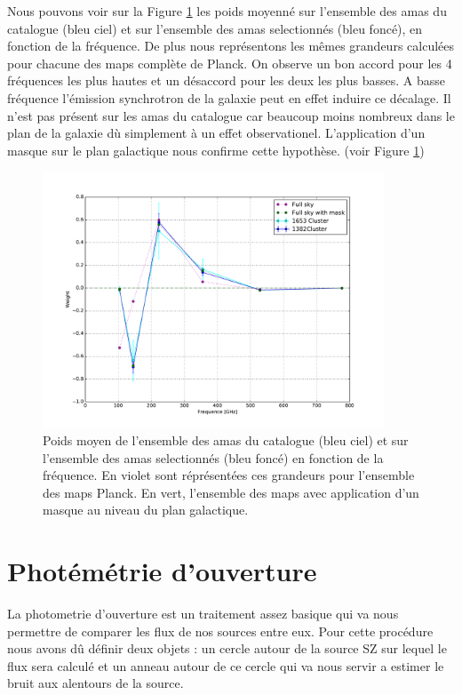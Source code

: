\documentclass[a4paper,11pt]{article}
\begin{document}
Nous pouvons voir sur la Figure \ref{w_full} les poids moyenné sur
l'ensemble des amas du catalogue (bleu ciel) et sur l'ensemble des
amas selectionnés (bleu foncé), en fonction de la fréquence. De plus
nous représentons les mêmes grandeurs calculées pour chacune des maps
complète de Planck. On observe un bon accord pour les 4 fréquences les
plus hautes et un désaccord pour les deux les plus basses. A basse
fréquence l'émission synchrotron de la galaxie peut en effet induire
ce décalage. Il n'est pas présent sur les amas du catalogue car
beaucoup moins nombreux dans le plan de la galaxie dù simplement à un
effet observationel. L'application d'un masque sur le plan galactique
nous confirme cette hypothèse. (voir Figure \ref{w_full})

\begin{figure}[h!]
  \centering
  \label{w_full}
  \includegraphics[width=4in]{w_full.pdf}
  \caption{Poids moyen de l'ensemble des amas du catalogue (bleu ciel) et sur
    l'ensemble des amas selectionnés (bleu foncé) en fonction
    de la fréquence. En violet sont réprésentées ces grandeurs pour
    l'ensemble des maps Planck. En vert, l'ensemble des maps avec
    application d'un masque au niveau du plan galactique.}
\end{figure}
  

\section{Photémétrie d'ouverture}
La photometrie d'ouverture est un traitement assez basique qui va nous 
permettre de comparer les flux de nos sources entre eux.
Pour cette procédure nous avons dû définir deux objets : un cercle autour de la source SZ
sur lequel le flux sera calculé et un anneau autour de ce cercle qui va nous servir a estimer le bruit 
aux alentours de la source.
\end{document}
